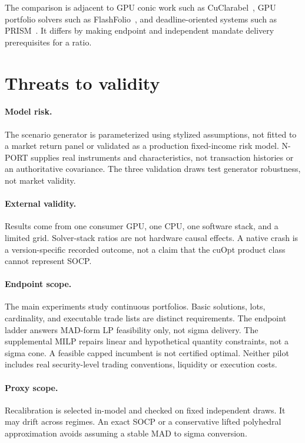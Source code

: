 \documentclass[11pt,a4paper]{article}
\begin{document}
The comparison is adjacent to GPU conic work such as
CuClarabel~\citep{chen2024cuclarabel}, GPU portfolio solvers such as
FlashFolio~\citep{jiang2026flashfolio}, and deadline-oriented systems such as
PRISM~\citep{ghosh2026prism}. It differs by making endpoint and independent
mandate delivery prerequisites for a ratio.

\section{Threats to validity}

\paragraph{Model risk.} The scenario generator is parameterized using stylized
assumptions, not fitted to a market return panel or validated as a production
fixed-income risk model. N-PORT supplies real instruments and
characteristics, not transaction histories or an authoritative covariance.
The three validation draws test generator robustness, not market validity.

\paragraph{External validity.} Results come from one consumer GPU, one CPU,
one software stack, and a limited grid. Solver-stack ratios are not hardware
causal effects. A native crash is a version-specific recorded outcome, not a
claim that the cuOpt product class cannot represent SOCP.

\paragraph{Endpoint scope.} The main experiments study continuous portfolios.
Basic solutions, lots, cardinality, and executable trade lists are distinct
requirements. The endpoint ladder answers MAD-form LP feasibility only, not
sigma delivery. The supplemental MILP repairs linear and hypothetical quantity
constraints, not a sigma cone. A feasible capped incumbent is not certified
optimal. Neither pilot includes real security-level trading conventions,
liquidity or execution costs.

\paragraph{Proxy scope.} Recalibration is selected in-model and checked on
fixed independent draws. It may drift across regimes. An exact SOCP or a
conservative lifted polyhedral approximation avoids assuming a stable MAD to
sigma conversion.
\end{document}
